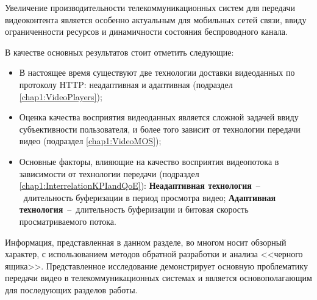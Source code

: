 Увеличение производительности телекоммуникационных систем для передачи видеоконтента является особенно актуальным для мобильных сетей связи, ввиду ограниченности ресурсов и динамичности состояния беспроводного канала.

В качестве основных результатов стоит отметить следующие:
\begin{itemize}
	\item В настоящее время существуют две технологии доставки видеоданных по протоколу HTTP: неадаптивная и адаптивная (подраздел \ref{chap1:VideoPlayers});
	\item Оценка качества восприятия видеоданных является сложной задачей ввиду субъективности пользователя, и более того зависит от технологии передачи видео (подраздел \ref{chap1:VideoMOS});
	\item Основные факторы, влияющие на качество восприятия видеопотока в зависимости от технологии передачи (подраздел \ref{chap1:InterrelationKPIandQoE}):
	\newline\textbf{Неадаптивная технология}~--~длительность буферизации в период просмотра видео;
	\newline\textbf{Адаптивная технология}~--~длительность буферизации и битовая скорость просматриваемого потока.
\end{itemize}

Информация, представленная в данном разделе, во многом носит обзорный характер, с использованием методов обратной разработки и анализа <<черного ящика>>. Представленное исследование демонстрирует основную проблематику передачи видео в телекоммуникационных системах и является основополагающим для последующих разделов работы.